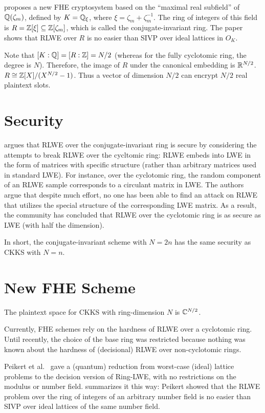 \documentclass[../fheimpl.tex]{subfiles}
\begin{document}
\cite{cryptoeprint:2018/952} proposes a new FHE cryptosystem based on the ``maximal real subfield'' of $\mathbb{Q}(\zeta_m)$, defined by $K=\mathbb{Q}_{\xi}$, where $\xi=\zeta_m+\zeta_m^{-1}$. The ring of integers of this field is $R=\mathbb{Z}[\xi]\subseteq \mathbb{Z}[\zeta_m]$, which is called the conjugate-invariant ring. The paper shows that RLWE over $R$ is no easier than SIVP over ideal lattices in $O_K$. 

Note that $[K:\mathbb{Q}]=[R:\mathbb{Z}]=N/2$ (whereas for the fully cyclotomic ring, the degree is $N$). Therefore, the image of $R$ under the canonical embedding is $\mathbb{R}^{N/2}$. $R\cong \mathbb{Z}[X]/(X^{N/2}-1)$. Thus a vector of dimension $N/2$ can encrypt $N/2$ real plaintext slots.

\section{Security}
\cite{cryptoeprint:2018/952} argues that RLWE over the conjugate-invariant ring is secure by considering the attempts to break RLWE over the cycltomic ring: RLWE embeds into LWE in the form of matrices with specific structure (rather than arbitrary matrices used in standard LWE). For instance, over the cyclotomic ring, the random component of an RLWE sample corresponds to a circulant matrix in LWE. The authors argue that despite much effort, no one has been able to find an attack on RLWE that utilizes the special structure of the corresponding LWE matrix. As a result, the community has concluded that RLWE over the cyclotomic ring is as secure as LWE (with half the dimension). 

In short, the conjugate-invariant scheme with $N=2n$ has the same security as CKKS with $N=n$.

\section{New FHE Scheme}

The plaintext space for CKKS with ring-dimension $N$ is $\mathbb{C}^{N/2}$.

Currently, FHE schemes rely on the hardness of RLWE over a cyclotomic ring. Until recently, the choice of the base ring was restricted because nothing was known about the hardness of (decisional) RLWE over non-cyclotomic rings.

Peikert et al.~\cite{cryptoeprint:2017/258} gave a (quantum) reduction from worst-case (ideal) lattice problems to the decision version of Ring-LWE, with no restrictions on the modulus or number field. \cite{cryptoeprint:2018/952} summarizes it this way: Peikert showed that the RLWE problem over the ring of integers of an arbitrary number field is no easier than SIVP over ideal lattices of the same number field.
\end{document}
